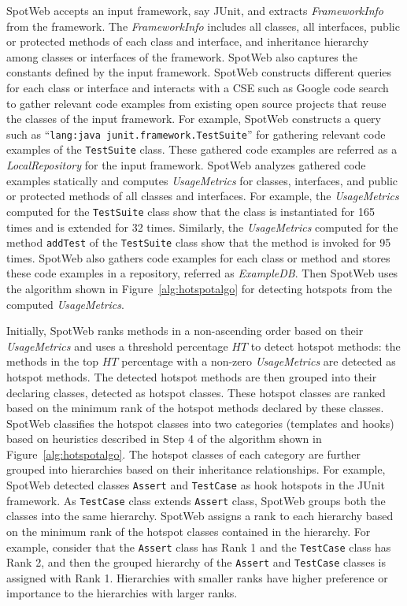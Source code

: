 \documentclass[conference]{IEEEtran}
\newcommand{\CodeIn}[1]{{\small\texttt{#1}}}
\newcommand{\Comment}[1]{}
\begin{document}
SpotWeb accepts an input framework, say JUnit, and extracts
\emph{FrameworkInfo} from the framework. The
\emph{FrameworkInfo} includes all classes, all interfaces, public
or protected methods of each class and interface, and inheritance
hierarchy among classes or interfaces of the framework. SpotWeb also captures
the constants defined by the input framework. SpotWeb
constructs different queries for each class or interface and
interacts with a CSE such as Google code search~\cite{GCSE} to
gather relevant code examples from existing open source projects that
reuse the classes of the input framework. For example, SpotWeb constructs
a query such as ``\CodeIn{lang:java junit.framework.TestSuite}'' for
gathering relevant code examples of the \CodeIn{TestSuite} class. These
gathered code examples are referred as a \emph{LocalRepository} for
the input framework. SpotWeb analyzes gathered code examples
statically and computes \emph{UsageMetrics} for classes, interfaces,
and public or protected methods of all classes and interfaces. For
example, the \emph{UsageMetrics} computed for the \CodeIn{TestSuite}
class show that the class is instantiated for 165 times and is
extended for 32 times. Similarly, the \emph{UsageMetrics} computed
for the method \CodeIn{addTest} of the \CodeIn{TestSuite} class show
that the method is invoked for 95 times. SpotWeb also gathers code
examples for each class or method and stores these code examples in
a repository, referred as \emph{ExampleDB}. Then SpotWeb uses the
algorithm shown in Figure~\ref{alg:hotspotalgo} for detecting
hotspots from the computed \emph{UsageMetrics}.

Initially, SpotWeb ranks methods in a non-ascending order based on
their \emph{UsageMetrics} and uses a threshold percentage $HT$ to
detect hotspot methods: the methods in the top $HT$ percentage with
a non-zero \emph{UsageMetrics} are detected as hotspot methods. 
The detected hotspot methods are then
grouped into their declaring classes, detected as hotspot classes.
These hotspot classes are ranked based on the minimum rank of the
hotspot methods declared by these classes. SpotWeb classifies the
hotspot classes into two categories (templates and hooks) based on
heuristics described in Step 4 of the algorithm shown in Figure~\ref{alg:hotspotalgo}. The hotspot classes of each
category are further grouped into hierarchies based on their
inheritance relationships. For example, SpotWeb detected classes
\CodeIn{Assert} and \CodeIn{TestCase} as hook hotspots in the JUnit
framework. As \CodeIn{TestCase} class extends \CodeIn{Assert} class,
SpotWeb groups both the classes into the same hierarchy. SpotWeb
assigns a rank to each hierarchy based on the minimum rank of the
hotspot classes contained in the hierarchy. For example, consider
that the \CodeIn{Assert} class has Rank 1 and the \CodeIn{TestCase}
class has Rank 2, and then the grouped hierarchy of the
\CodeIn{Assert} and \CodeIn{TestCase} classes is assigned with Rank
1. \Comment{The rank attribute uniquely identifies a hierarchy among all
other hierarchies.} Hierarchies with smaller ranks have higher preference
or importance to the hierarchies with larger ranks.
\end{document}
